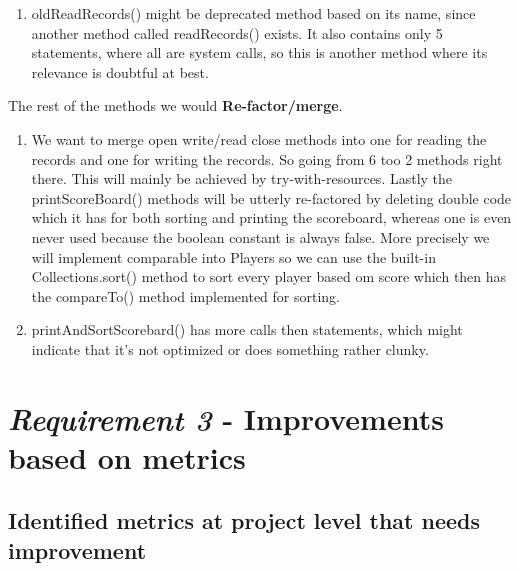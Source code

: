 \documentclass{article}
\begin{document}
\begin{enumerate}
\begin{enumerate}
\item
oldReadRecords() might be deprecated method based on its name, since another method called readRecords() exists. It also contains only 5 statements, where all are system calls, so this is another method where its relevance is doubtful at best.
\end{enumerate}
\vspace{0.4cm}
The rest of the methods we would \textbf{Re-factor/merge}.
\vspace{0.2cm}
\begin{enumerate}
\item
We want to merge open write/read close methods into one for
reading the records and one for writing the records. So going from 6
too 2 methods right there. This will mainly be achieved by try-with-resources.
Lastly the printScoreBoard() methods will be utterly re-factored by deleting
double code which it has for both sorting and printing the scoreboard, whereas one is even never used because the boolean constant is always false. More precisely we will implement comparable into Players so we can use the built-in Collections.sort() method to sort every player based om score which then has the compareTo() method implemented for sorting.

\item
printAndSortScorebard() has more calls then statements, which might indicate that it's not optimized or does something rather clunky.

\end{enumerate}

\end{enumerate}



\section{\textit{Requirement 3} - Improvements based on metrics}

\subsection{Identified metrics at project level that needs improvement}
\end{document}
